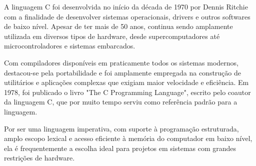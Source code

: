 A linguagem C foi desenvolvida no início da década de 1970 por Dennis Ritchie com 
a finalidade de desenvolver sistemas operacionais, drivers e outros softwares de 
baixo nível. Apesar de ter mais de 50 anos, continua sendo amplamente utilizada 
em diversos tipos de hardware, desde supercomputadores até microcontroladores e 
sistemas embarcados.

Com compiladores disponíveis em praticamente todos os sistemas modernos, 
destacou-se pela portabilidade e foi amplamente empregada na construção de 
utilitários e aplicações complexas que exigiam maior velocidade e eficiência. 
Em 1978, foi publicado o livro "The C Programming Language", escrito pelo 
coautor da linguagem C, que por muito tempo serviu como referência padrão para 
a linguagem.

Por ser uma linguagem imperativa, com suporte à programação estruturada, 
amplo escopo lexical e acesso eficiente à memória do computador em baixo 
nível, ela é frequentemente a escolha ideal para projetos em sistemas com 
grandes restrições de hardware.
